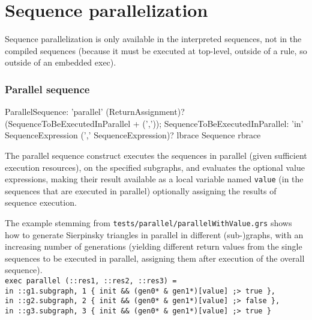 \section{Sequence parallelization}\label{sec:sequenceparallelization}

Sequence parallelization is only available in the interpreted sequences, not in the compiled sequences (because it must be executed at top-level, outside of a rule, so outside of an embedded exec).

\subsubsection*{Parallel sequence}

\begin{rail}
  ParallelSequence: 'parallel' (ReturnAssignment)? (SequenceToBeExecutedInParallel + (','));
	SequenceToBeExecutedInParallel: 'in' SequenceExpression (',' SequenceExpression)? lbrace Sequence rbrace
\end{rail}

The parallel sequence construct executes the sequences in parallel (given sufficient execution resources),
on the specified subgraphs, and evaluates the optional value expressions, making their result available as a local variable named \texttt{value} (in the sequences that are executed in parallel) optionally assigning the results of sequence execution.

\begin{example}
The example stemming from \texttt{tests/parallel/parallelWithValue.grs} shows how to generate Sierpinsky triangles in parallel in different (sub-)graphs, with an increasing number of generations (yielding different return values from the single sequences to be executed in parallel, assigning them after execution of the overall sequence).\\
\verb#exec parallel (::res1, ::res2, ::res3) = #\\
\verb#in ::g1.subgraph, 1 { init && (gen0* & gen1*)[value] ;> true },#\\
\verb#in ::g2.subgraph, 2 { init && (gen0* & gen1*)[value] ;> false },#\\
\verb#in ::g3.subgraph, 3 { init && (gen0* & gen1*)[value] ;> true }#
\end{example}


